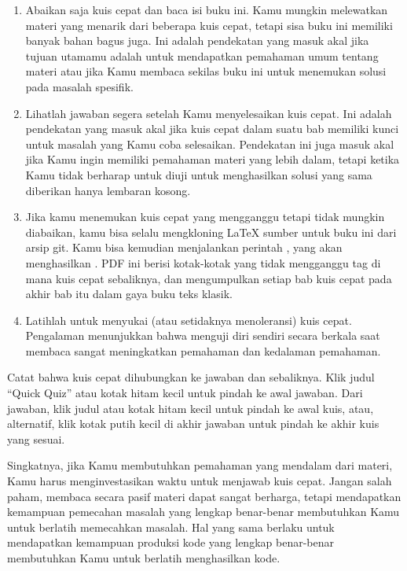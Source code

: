{{\begin{enumerate}
\item	Abaikan saja kuis cepat dan baca isi buku ini.
	Kamu mungkin melewatkan materi yang menarik dari
	beberapa kuis cepat, tetapi sisa buku ini
	memiliki banyak bahan bagus juga.
	Ini adalah pendekatan yang masuk akal jika tujuan utamamu
	adalah untuk mendapatkan pemahaman umum tentang materi
	atau jika Kamu membaca sekilas buku ini untuk menemukan
	solusi pada masalah spesifik.
\item	Lihatlah jawaban segera setelah Kamu menyelesaikan kuis cepat.
	Ini adalah pendekatan yang masuk akal jika kuis cepat
	dalam suatu bab memiliki kunci untuk masalah yang Kamu
	coba selesaikan.
	Pendekatan ini juga masuk akal jika Kamu ingin memiliki pemahaman materi yang lebih dalam,
	tetapi ketika Kamu tidak berharap untuk diuji untuk
	menghasilkan solusi yang sama diberikan hanya lembaran kosong.
\item   Jika kamu menemukan kuis cepat yang mengganggu tetapi tidak mungkin
	diabaikan, kamu bisa selalu mengkloning \LaTeX{} sumber untuk
	buku ini dari arsip git.
	Kamu bisa kemudian menjalankan perintah , yang akan
	menghasilkan .
	PDF ini berisi kotak-kotak yang tidak mengganggu tag di mana kuis cepat
	sebaliknya, dan mengumpulkan setiap bab kuis cepat
	pada akhir bab itu dalam gaya buku teks klasik.
\item	Latihlah untuk menyukai (atau setidaknya menoleransi) kuis cepat.
	Pengalaman menunjukkan bahwa menguji diri sendiri secara berkala
	saat membaca sangat meningkatkan pemahaman dan kedalaman
	pemahaman.
\end{enumerate}

Catat bahwa kuis cepat dihubungkan ke jawaban dan sebaliknya.
Klik judul ``Quick Quiz'' atau kotak hitam kecil
untuk pindah ke awal jawaban.
Dari jawaban, klik judul atau kotak hitam kecil untuk
pindah ke awal kuis, atau, alternatif, klik kotak putih kecil
di akhir jawaban untuk pindah ke akhir
kuis yang sesuai.
}\QuickQuizEndE
}

Singkatnya, jika Kamu membutuhkan pemahaman yang mendalam
dari materi, Kamu harus menginvestasikan waktu
untuk menjawab kuis cepat.
Jangan salah paham, membaca secara pasif materi dapat sangat
berharga, tetapi mendapatkan kemampuan pemecahan masalah yang lengkap benar-benar
membutuhkan Kamu untuk berlatih memecahkan masalah.
Hal yang sama berlaku untuk mendapatkan kemampuan produksi kode yang lengkap
benar-benar membutuhkan Kamu untuk berlatih menghasilkan kode.


